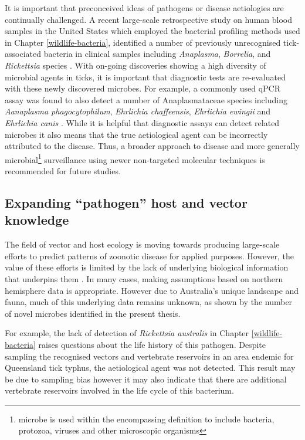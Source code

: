 \documentclass[a4paper, nobind]{templates/ociamthesis}
\begin{document}
It is important that preconceived ideas of pathogens or disease aetiologies are continually challenged.
A recent large-scale retrospective study on human blood samples in the United States which employed the bacterial profiling methods used in Chapter \ref{wildlife-bacteria}, identified a number of previously unrecognised tick-associated bacteria in clinical samples including \emph{Anaplasma}, \emph{Borrelia}, and \emph{Rickettsia} species \autocite{kingryTargetedMetagenomicsClinical2020}.
With on-going discoveries showing a high diversity of microbial agents in ticks, it is important that diagnostic tests are re-evaluated with these newly discovered microbes.
For example, a commonly used qPCR assay was found to also detect a number of Anaplasmataceae species including \emph{Aanaplasma phagocytophilum}, \emph{Ehrlichia chaffeensis}, \emph{Ehrlichia ewingii} and \emph{Ehrlichia canis} \autocite{murphyPrevalenceDistributionHuman2017}.
While it is helpful that diagnostic assays can detect related microbes it also means that the true aetiological agent can be incorrectly attributed to the disease.
Thus, a broader approach to disease and more generally microbial\footnote{microbe is used within the encompassing definition to include bacteria, protozoa, viruses and other microscopic organisms} surveillance using newer non-targeted molecular techniques is recommended for future studies.

\hypertarget{expanding-pathogen-host-and-vector-knowledge}{%
\subsection{Expanding ``pathogen'' host and vector knowledge}\label{expanding-pathogen-host-and-vector-knowledge}}

The field of vector and host ecology is moving towards producing large-scale efforts to predict patterns of zoonotic disease for applied purposes.
However, the value of these efforts is limited by the lack of underlying biological information that underpins them \autocite{alberyFastlivedHostsZoonotic2020}.
In many cases, making assumptions based on northern hemisphere data is appropriate.
However due to Australia's unique landscape and fauna, much of this underlying data remains unknown, as shown by the number of novel microbes identified in the present thesis.

For example, the lack of detection of \emph{Rickettsia australis} in Chapter \ref{wildlife-bacteria} raises questions about the life history of this pathogen.
Despite sampling the recognised vectors and vertebrate reservoirs \autocite{campbellRickettsiosesAustraliaIsolation1974,sextonSpottedFeverGroup1991} in an area endemic for Queensland tick typhus, the aetiological agent was not detected.
This result may be due to sampling bias however it may also indicate that there are additional vertebrate reservoirs involved in the life cycle of this bacterium.
\end{document}
